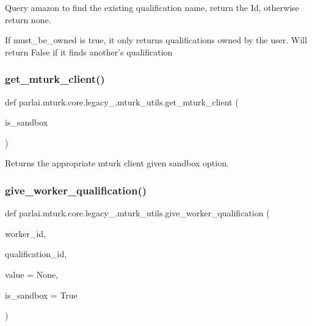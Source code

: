 \begin{DoxyVerb}Query amazon to find the existing qualification name, return the Id, otherwise
return none.

If must_be_owned is true, it only returns qualifications owned by the user. Will
return False if it finds another's qualification
\end{DoxyVerb}
 \mbox{\label{namespaceparlai_1_1mturk_1_1core_1_1legacy__2018_1_1mturk__utils_a9999d5b551e569fe3ddd368e4e659b65}} 
\subsubsection{\texorpdfstring{get\+\_\+mturk\+\_\+client()}{get\_mturk\_client()}}
{\footnotesize\ttfamily def parlai.\+mturk.\+core.\+legacy\+\_.\+mturk\+\_\+utils.\+get\+\_\+mturk\+\_\+client (\begin{DoxyParamCaption}\item[{}]{is\+\_\+sandbox }\end{DoxyParamCaption})}

\begin{DoxyVerb}Returns the appropriate mturk client given sandbox option.
\end{DoxyVerb}
 \mbox{\label{namespaceparlai_1_1mturk_1_1core_1_1legacy__2018_1_1mturk__utils_aaaf07be966ed2720b918f8dd2775e18a}} 
\subsubsection{\texorpdfstring{give\+\_\+worker\+\_\+qualification()}{give\_worker\_qualification()}}
{\footnotesize\ttfamily def parlai.\+mturk.\+core.\+legacy\+\_.\+mturk\+\_\+utils.\+give\+\_\+worker\+\_\+qualification (\begin{DoxyParamCaption}\item[{}]{worker\+\_\+id,  }\item[{}]{qualification\+\_\+id,  }\item[{}]{value = {\ttfamily None},  }\item[{}]{is\+\_\+sandbox = {\ttfamily True} }\end{DoxyParamCaption})}

